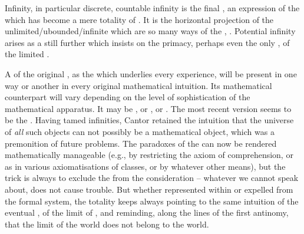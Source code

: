%
Infinity, in particular discrete, countable infinity is the final
, an  expression of the  which
has become a mere totality of . It is the horizontal projection
of the unlimited/ubounded/infinite which are so many ways of 
the , .  Potential infinity arises as a still further
 which insists on the primacy, perhaps even the only
, of the limited . 


A  of the original , as the  which
underlies every experience, will be present in one way or another in every
original mathematical intuition.  Its mathematical counterpart will vary
depending on the level of sophistication of the mathematical apparatus. It may
be , or ,  or .  The most recent
version seems to be the . Having tamed
infinities, Cantor retained the intuition that the universe of {\em all} such
objects can not possibly be a mathematical object, which was a premonition of
future problems.  The paradoxes of the  can now be rendered
mathematically manageable (e.g., by restricting the axiom of comprehension, or
as in various axiomatisations of classes, or by whatever other means), but the
trick is always to exclude the  from the
consideration -- whatever we cannot speak about, does not cause trouble.  But
whether represented within or expelled from the formal system, the totality keeps
always pointing to the same intuition of the eventual , of the
 limit of , and reminding, along the lines of
the first antinomy, that the limit of the world does not belong to the world.



